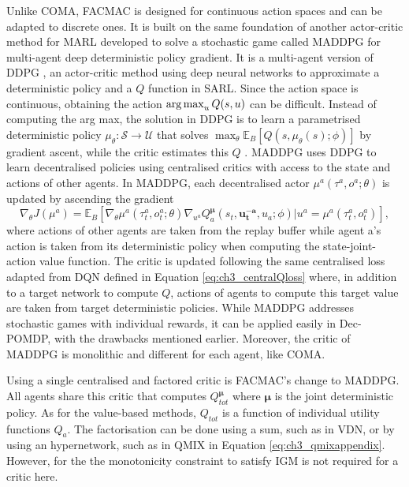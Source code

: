 Unlike COMA, FACMAC is designed for continuous action spaces and can be adapted to discrete ones.
It is built on the same foundation of another actor-critic method for MARL developed to solve a stochastic game called MADDPG \citep{lowe2017multi} for multi-agent deep deterministic policy gradient.
It is a multi-agent version of DDPG \citep{lillicrap2015continuous}, an actor-critic method using deep neural networks to approximate a deterministic policy and a $Q$ function in SARL.
Since the action space is continuous, obtaining the action $\operatorname*{arg\,max}_u Q(s, u)$ can be difficult.
Instead of computing the arg max, the solution in DDPG is to learn a parametrised deterministic policy $\mu_\theta:\mathcal{S}\rightarrow\mathcal{U}$ that solves $\max_\theta \mathbb{E}_B[Q(s, \mu_\theta(s); \phi)]$ by gradient ascent, while the critic estimates this $Q$ \citep{silver2014deterministic}.
MADDPG uses DDPG to learn decentralised policies using centralised critics with access to the state and actions of other agents.
In MADDPG, each decentralised actor $\mu^a(\tau^a, o^a;\theta)$ is updated by ascending the gradient
\begin{equation}
\label{eq:ch3_maddpg_grad}
    \nabla_\theta J(\mu^a) = \mathbb{E}_B\left[\nabla_{\theta} \mu^a(\tau_t^a, o_t^a;\theta) \nabla_{u^a} Q_a^{\mathbf{\mu}}(s_t, \mathbf{u_t^{-a}}, u_a; \phi)|u^a=\mu^a(\tau_t^a, o_t^a)\right],
\end{equation}
where actions of other agents are taken from the replay buffer while agent a's action is taken from its deterministic policy when computing the state-joint-action value function.
The critic is updated following the same centralised loss adapted from DQN defined in Equation \ref{eq:ch3_centralQloss} where, in addition to a target network to compute $Q$, actions of agents to compute this target value are taken from target deterministic policies.
While MADDPG addresses stochastic games with individual rewards, it can be applied easily in Dec-POMDP, with the drawbacks mentioned earlier.
Moreover, the critic of MADDPG is monolithic and different for each agent, like COMA.

Using a single centralised and factored critic is FACMAC's change to MADDPG.
All agents share this critic that computes $Q_{tot}^{\mathbf{\mu}}$ where $\mathbf{\mu}$ is the joint deterministic policy.
As for the value-based methods, $Q_{tot}$ is a function of individual utility functions $Q_a$.
The factorisation can be done using a sum, such as in VDN, or by using an hypernetwork, such as in QMIX in Equation \ref{eq:ch3_qmixappendix}.
However, for the the monotonicity constraint to satisfy IGM is not required for a critic here.

